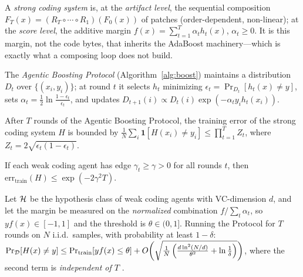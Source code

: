 \begin{definition}
\label{def:strong-agent}
A \emph{strong coding system} is, at the \emph{artifact level}, the sequential composition $F_T(x)=(R_T\circ\cdots\circ R_1)(F_0(x))$ of patches (order-dependent, non-linear); at the \emph{score level}, the additive margin $f(x)=\sum_{t=1}^T\alpha_t h_t(x)$, $\alpha_t\ge0$. It is this margin, not the code bytes, that inherits the AdaBoost machinery---which is exactly what a composing loop does not build.
\end{definition}

\begin{definition}
\label{def:protocol}
The \emph{Agentic Boosting Protocol} (Algorithm~\ref{alg:boost}) maintains a distribution $D_t$ over $\{(x_i,y_i)\}$; at round $t$ it selects $h_t$ minimizing $\epsilon_t=\Pr_{D_t}[h_t(x)\ne y]$, sets $\alpha_t=\tfrac12\ln\tfrac{1-\epsilon_t}{\epsilon_t}$, and updates $D_{t+1}(i)\propto D_t(i)\exp(-\alpha_t y_i h_t(x_i))$.
\end{definition}

\begin{theorem}
\label{thm:training-error}
After $T$ rounds of the Agentic Boosting Protocol, the training error of the strong coding system $H$ is bounded by $\frac{1}{N}\sum_i\mathbf{1}[H(x_i)\ne y_i]\le\prod_{t=1}^T Z_t$, where $Z_t=2\sqrt{\epsilon_t(1-\epsilon_t)}$.
\end{theorem}

\begin{corollary}
\label{cor:convergence}
If each weak coding agent has edge $\gamma_t\ge\gamma>0$ for all rounds $t$, then $\mathrm{err}_{\mathrm{train}}(H)\le\exp(-2\gamma^2 T)$.
\end{corollary}

\begin{theorem}
\label{thm:generalization}
Let $\mathcal{H}$ be the hypothesis class of weak coding agents with VC-dimension $d$, and let the margin be measured on the \emph{normalized} combination $f/\sum_t\alpha_t$, so $yf(x)\in[-1,1]$ and the threshold is $\theta\in(0,1]$. Running the Protocol for $T$ rounds on $N$ i.i.d.\ samples, with probability at least $1-\delta$: $\Pr_{\mathcal{D}}[H(x)\ne y]\le\Pr_{\mathrm{train}}[yf(x)\le\theta]+O\!\left(\sqrt{\tfrac{1}{N}\left(\tfrac{d\ln^2(N/d)}{\theta^2}+\ln\tfrac1\delta\right)}\right)$, where the second term is \emph{independent of $T$} \citep{schapire1998boosting}.
\end{theorem}

